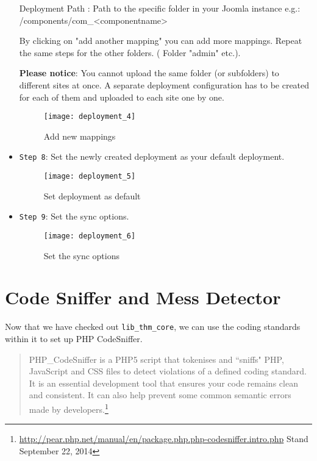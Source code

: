 \begin{itemize}
	Deployment Path : Path to the specific folder in your Joomla instance
    e.g.: /components/com\_<componentname>
	
	By clicking on "add another mapping" you can add more mappings.
	Repeat the same steps for the other folders. ( Folder "admin" etc.).
	
	\textbf{Please notice}: You cannot upload the same folder (or subfolders) to different sites at once. A separate deployment configuration has to be created for each of them and uploaded to each site one by one.
	\begin{figure}[H] 
		\centering
		\vspace{3pt}
		\texttt{[image: deployment\_4]}
		\caption{Add new mappings}
	\end{figure}
	\item \texttt{Step 8}: Set the newly created deployment as your default deployment.
	\begin{figure}[H] 
		\centering
		\vspace{3pt}
		\texttt{[image: deployment\_5]}
		\caption{Set deployment as default}
	\end{figure}
	\item \texttt{Step 9}: Set the sync options.
	\begin{figure}[H] 
		\centering
		\vspace{3pt}
		\texttt{[image: deployment\_6]}
		\caption{Set the sync options}
	\end{figure}
\end{itemize}

\section{Code Sniffer and Mess Detector}
\label{sec:qatools}

Now that we have checked out \texttt{lib\_thm\_core}, we can use the coding standards within it to set up PHP CodeSniffer.

\begin{quote}
	PHP\_CodeSniffer is a PHP5 script that tokenises and ``sniffs" PHP, JavaScript and CSS files to detect violations of a defined coding standard. It is an essential development tool that ensures your code remains clean and consistent. It can also help prevent some common semantic errors made by developers.\footnote{\url{http://pear.php.net/manual/en/package.php.php-codesniffer.intro.php} Stand September 22, 2014}
\end{quote}

